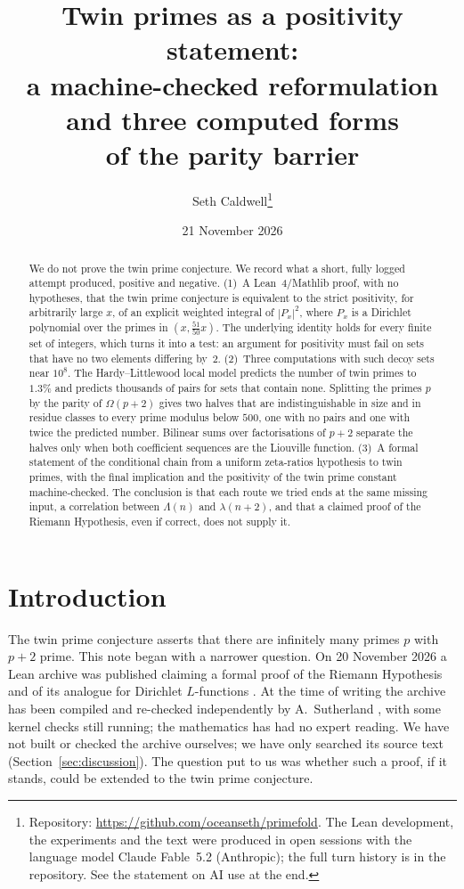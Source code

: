 \documentclass[11pt]{article}
\title{Twin primes as a positivity statement:\\
a machine-checked reformulation and three computed forms\\ of the parity barrier}
\author{Seth Caldwell\thanks{Repository: \url{https://github.com/oceanseth/primefold}.
The Lean development, the experiments and the text were produced in open sessions with
the language model Claude Fable~5.2 (Anthropic); the full turn history is in the
repository. See the statement on AI use at the end.}}
\date{21 November 2026}
\theoremstyle{definition}
\theoremstyle{remark}
\begin{document}
\maketitle

\begin{abstract}
We do not prove the twin prime conjecture. We record what a short, fully logged
attempt produced, positive and negative. (1)~A Lean~4/Mathlib proof, with no
hypotheses, that the twin prime conjecture is equivalent to the strict
positivity, for arbitrarily large $x$, of an explicit weighted integral of
$|P_x|^2$, where $P_x$ is a Dirichlet polynomial over the primes in
$(x, \tfrac{51}{50}x)$. The underlying identity holds for every finite set of
integers, which turns it into a test: an argument for positivity must fail on
sets that have no two elements differing by~$2$. (2)~Three computations with such
decoy sets near $10^8$. The Hardy--Littlewood local model predicts the number of
twin primes to $1.3\%$ and predicts thousands of pairs for sets that contain none.
Splitting the primes $p$ by the parity of $\Omega(p+2)$ gives two halves that are
indistinguishable in size and in residue classes to every prime modulus below
$500$, one with no pairs and one with twice the predicted number. Bilinear sums
over factorisations of $p+2$ separate the halves only when both coefficient
sequences are the Liouville function. (3)~A formal statement of the conditional
chain from a uniform zeta-ratios hypothesis to twin primes, with the final
implication and the positivity of the twin prime constant machine-checked. The
conclusion is that each route we tried ends at the same missing input, a
correlation between $\Lambda(n)$ and $\lambda(n+2)$, and that a claimed proof of
the Riemann Hypothesis, even if correct, does not supply it.
\end{abstract}

\section{Introduction}

The twin prime conjecture asserts that there are infinitely many primes $p$ with
$p+2$ prime. This note began with a narrower question. On 20 November 2026 a
Lean archive was published claiming a formal proof of the Riemann Hypothesis and
of its analogue for Dirichlet $L$-functions \cite{rhclaim}. At the time of
writing the archive has been compiled and re-checked independently by
A.~Sutherland \cite{rhcheck}, with some kernel checks still running; the
mathematics has had no expert reading. We have not built or checked the archive
ourselves; we have only searched its source text (Section~\ref{sec:discussion}).
The question put to us was whether such a proof, if it stands, could
be extended to the twin prime conjecture.
\end{document}
